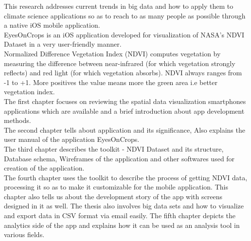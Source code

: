 
This research addresses current trends in big data and how to apply them to climate science applications so as to reach to as many people as possible through a native iOS mobile application. \\
EyesOnCrops is an iOS application developed for visualization of NASA's NDVI Dataset in a very user-friendly manner. \\
Normalized Difference Vegetation Index (NDVI) computes vegetation by measuring the difference between near-infrared (for which vegetation strongly reflects) and red light (for which vegetation absorbs). NDVI always ranges from -1 to +1. More positives the value means more the green area i.e better vegetation index. \\
The first chapter focuses on reviewing the spatial data visualization smartphones applications which are available and a brief introduction about app development methods. \\
The second chapter tells about application and its significance, Also explains the user manual of the application EyesOnCrops. \\
The third chapter describes the toolkit - NDVI Dataset and its structure, Database schema, Wireframes of the application and other softwares used for creation of the application. \\
The fourth chapter uses the toolkit to describe the process of getting NDVI data, processing it so as to make it customizable for the mobile application. This chapter also tells us about the development story of the app with screens designed in it as well. The thesis also involves big data sets and how to visualize and export data in CSV format via email easily.
The fifth chapter depicts the analytics side of the app and explains how it can be used as an analysis tool in various fields. \\



